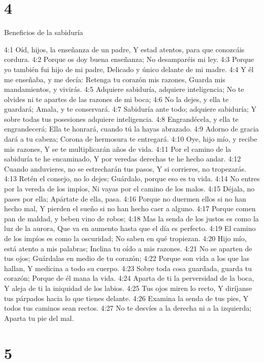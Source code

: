 \chapter{4}

Beneficios de la sabiduría  

4:1 Oíd, hijos, la enseñanza de un padre,  
Y estad atentos, para que conozcáis cordura.  
4:2 Porque os doy buena enseñanza;  
No desamparéis mi ley.  
4:3 Porque yo también fui hijo de mi padre,  
Delicado y único delante de mi madre.  
4:4 Y él me enseñaba, y me decía:  
Retenga tu corazón mis razones,  
Guarda mis mandamientos, y vivirás.  
4:5 Adquiere sabiduría, adquiere inteligencia;  
No te olvides ni te apartes de las razones de mi boca;  
4:6 No la dejes, y ella te guardará;  
Amala, y te conservará.  
4:7 Sabiduría ante todo; adquiere sabiduría;  
Y sobre todas tus posesiones adquiere inteligencia.  
4:8 Engrandécela, y ella te engrandecerá;  
Ella te honrará, cuando tú la hayas abrazado.  
4:9 Adorno de gracia dará a tu cabeza;  
Corona de hermosura te entregará.  
4:10 Oye, hijo mío, y recibe mis razones,  
Y se te multiplicarán años de vida.  
4:11 Por el camino de la sabiduría te he encaminado,  
Y por veredas derechas te he hecho andar.  
4:12 Cuando anduvieres, no se estrecharán tus pasos,  
Y si corrieres, no tropezarás.  
4:13 Retén el consejo, no lo dejes;  
Guárdalo, porque eso es tu vida.  
4:14 No entres por la vereda de los impíos,  
Ni vayas por el camino de los malos.  
4:15 Déjala, no pases por ella;  
Apártate de ella, pasa.  
4:16 Porque no duermen ellos si no han hecho mal,  
Y pierden el sueño si no han hecho caer a alguno.  
4:17 Porque comen pan de maldad, y beben vino de robos;  
4:18 Mas la senda de los justos es como la luz de la aurora,  
Que va en aumento hasta que el día es perfecto.  
4:19 El camino de los impíos es como la oscuridad;  
No saben en qué tropiezan.  
4:20 Hijo mío, está atento a mis palabras;  
Inclina tu oído a mis razones.  
4:21 No se aparten de tus ojos;  
Guárdalas en medio de tu corazón;  
4:22 Porque son vida a los que las hallan,  
Y medicina a todo su cuerpo.  
4:23 Sobre toda cosa guardada, guarda tu corazón;  
Porque de él mana la vida.  
4:24 Aparta de ti la perversidad de la boca,  
Y aleja de ti la iniquidad de los labios.  
4:25 Tus ojos miren lo recto,  
Y diríjanse tus párpados hacia lo que tienes delante.  
4:26 Examina la senda de tus pies, 
Y todos tus caminos sean rectos.  
4:27 No te desvíes a la derecha ni a la izquierda;  
Aparta tu pie del mal.  

\chapter{5}

